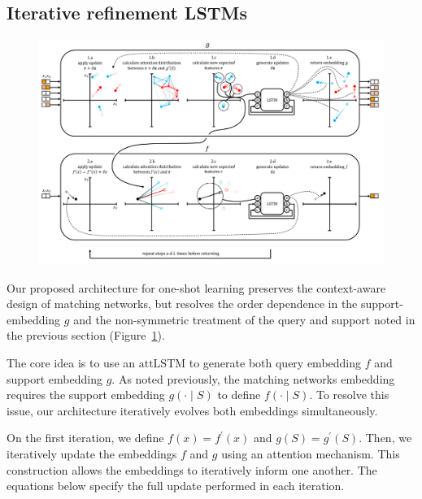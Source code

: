 \documentclass[journal=jacsat,manuscript=article]{achemso}
\begin{document}


\subsection{Iterative refinement LSTMs}
\begin{figure}[h]
\includegraphics[width=\textwidth]{resiembedding_graphic_v2.png}
\label{fig:resiembed}
\end{figure}

Our proposed architecture for one-shot learning preserves the context-aware design of matching networks, but resolves the order dependence in the support-embedding $g$ and the non-symmetric treatment of the query and support noted in the previous section (Figure~\ref{fig:resiembed}).

The core idea is to use an $\text{attLSTM}$ to generate both query embedding $f$ and support embedding $g$. As noted previously, the matching networks \cite{vinyals2016matching} embedding requires the support embedding $g(\cdot \mid S)$ to define $f(\cdot \mid S)$. To resolve this issue, our architecture iteratively evolves both embeddings simultaneously.

On the first iteration, we define $f(x) = f^\prime(x)$ and $g(S)= g^\prime(S)$. Then, we iteratively update the embeddings $f$ and $g$ using an attention mechanism. This construction allows the embeddings to iteratively inform one another. The equations below specify the full update performed in each iteration.
\end{document}
